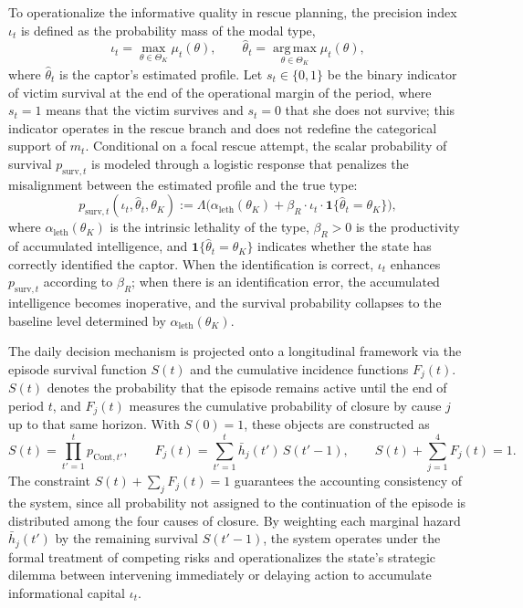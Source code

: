 \documentclass[pdflatex,sn-mathphys-ay]{sn-jnl}
\theoremstyle{plain}
\theoremstyle{definition}
\newcommand{\ThetaK}{\Theta_K}
\newcommand{\1}{\mathbf{1}}
\begin{document}
To operationalize the informative quality in rescue planning, the precision index $\iota_t$ is defined as the probability mass of the modal type,
\begin{equation}
\iota_t=\max_{\theta\in\ThetaK}\mu_t(\theta),\qquad\hat{\theta}_t=\operatorname*{arg\,max}_{\theta\in\ThetaK}\mu_t(\theta),
\label{eq:iota}
\end{equation}
where $\hat{\theta}_t$ is the captor's estimated profile. Let $s_t\in\{0,1\}$ be the binary indicator of victim survival at the end of the operational margin of the period, where $s_t=1$ means that the victim survives and $s_t=0$ that she does not survive; this indicator operates in the rescue branch and does not redefine the categorical support of $m_t$. Conditional on a focal rescue attempt, the scalar probability of survival $p_{\mathrm{surv},t}$ is modeled through a logistic response that penalizes the misalignment between the estimated profile and the true type:
\begin{equation}
p_{\mathrm{surv},t}(\iota_t,\hat{\theta}_t,\theta_K):=\Lambda\bigl(\alpha_{\mathrm{leth}}(\theta_K)+\beta_R\cdot\iota_t\cdot\mathbf{1}\{\hat{\theta}_t=\theta_K\}\bigr),
\label{eq:p-surv}
\end{equation}
where $\alpha_{\mathrm{leth}}(\theta_K)$ is the intrinsic lethality of the type, $\beta_R>0$ is the productivity of accumulated intelligence, and $\mathbf{1}\{\hat{\theta}_t=\theta_K\}$ indicates whether the state has correctly identified the captor. When the identification is correct, $\iota_t$ enhances $p_{\mathrm{surv},t}$ according to $\beta_R$; when there is an identification error, the accumulated intelligence becomes inoperative, and the survival probability collapses to the baseline level determined by $\alpha_{\mathrm{leth}}(\theta_K)$.

The daily decision mechanism is projected onto a longitudinal framework via the episode survival function $S(t)$ and the cumulative incidence functions $F_j(t)$. $S(t)$ denotes the probability that the episode remains active until the end of period $t$, and $F_j(t)$ measures the cumulative probability of closure by cause $j$ up to that same horizon. With $S(0)=1$, these objects are constructed as
\begin{equation}
S(t)=\prod_{t'=1}^{t}p_{\mathrm{Cont},t'},\qquad F_j(t)=\sum_{t'=1}^{t}\bar h_j(t')\,S(t'-1),\qquad S(t)+\sum_{j=1}^{4}F_j(t)=1.
\label{eq:longitudinal}
\end{equation}
The constraint $S(t)+\sum_j F_j(t)=1$ guarantees the accounting consistency of the system, since all probability not assigned to the continuation of the episode is distributed among the four causes of closure. By weighting each marginal hazard $\bar h_j(t')$ by the remaining survival $S(t'-1)$, the system operates under the formal treatment of competing risks and operationalizes the state's strategic dilemma between intervening immediately or delaying action to accumulate informational capital $\iota_t$.
\end{document}
